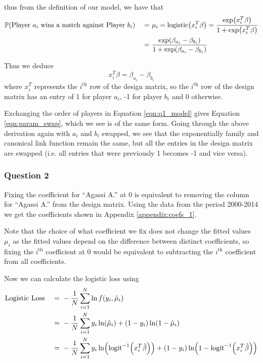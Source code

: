 \documentclass[11pt]{article} %
\let\originalleft\left
\let\originalright\right
\renewcommand{\left}{\mathopen{}\mathclose\bgroup\originalleft}
\renewcommand{\right}{\aftergroup\egroup\originalright}
\newcommand{\logistic}{\text{logistic}}
\begin{document}
thus from the definition of our model, we have that
\begin{alignat*}{2}
	& \mathbb{P}\left(\text{Player }a_i\text{ wins a match against Player }b_i\right)&\ =\ & \mu_i = \logistic\left(x_i^T\beta\right) = \frac{\exp\left(x_i^T\beta\right)}{1+\exp\left(x_i^T\beta\right)} \\
	& &\ =\ & \frac{\exp\left(\beta_{a_i} - \beta_{b_i}\right)}{1+\exp\left(\beta_{a_i} - \beta_{b_i}\right)}
\end{alignat*}

Thus we deduce 
$$x_i^T\beta = \beta_{a_i} - \beta_{b_i}$$ 
where $x_i^T$ represents the $i^\text{th}$ row of the design matrix, so the $i^\text{th}$ row of the design matrix has an entry of 1 for player $a_i$, -1 for player $b_i$ and 0 otherwise.

Exchanging the order of players in Equation \ref{eqn:q1_model} gives Equation \ref{eqn:param_swap}, which we see is of the same form. Going through the above derivation again with $a_i$ and $b_i$ swapped, we see that the exponentially family and canonical link function remain the same, but all the entries in the design matrix are swapped (i.e. all entries that were previously 1 becomes -1 and vice versa).

\subsubsection*{Question 2}

Fixing the coefficient for ``Agassi A.'' at 0 is equivalent to removing the column for ``Agassi A.'' from the design matrix. Using the data from the period 2000-2014 we get the coefficients shown in Appendix \ref{appendix:coefs_1}.


Note that the choice of what coefficient we fix does not change the fitted values $\mu_i$ as the fitted values depend on the difference between distinct coefficients, so fixing the $i^\text{th}$ coefficient at 0 would be equivalent to subtracting the $i^\text{th}$ coefficient from all coefficients.

Now we can calculate the logistic loss using
\begin{alignat*}{2}
	& \text{Logistic Loss} &\ =\ & -\frac{1}{N}\sum_{i=1}^{N}{\ln{f\left(y_i, \hat{\mu}_i\right)}} \\
	& &\ =\ & -\frac{1}{N}\sum_{i=1}^{N}{y_i\ln\left(\hat{\mu}_i\right)+ \left(1-y_i\right)\ln\left({1-\hat{\mu}_i}\right)} \\
	& &\ =\ & -\frac{1}{N}\sum_{i=1}^{N}{y_i\ln\left(\text{logit}^{-1}\left(x_i^T\hat{\beta}\right)\right)+ \left(1-y_i\right)\ln\left({1-\text{logit}^{-1}\left(x_i^T\hat{\beta}\right)}\right)}
\end{alignat*}
\end{document}
